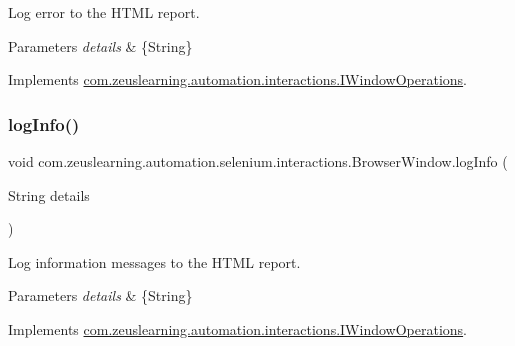 Log error to the H\+T\+ML report.


\begin{DoxyParams}{Parameters}
{\em details} & \{String\} \\
\hline
\end{DoxyParams}


Implements \hyperlink{interfacecom_1_1zeuslearning_1_1automation_1_1interactions_1_1IWindowOperations_ac2c4ec2b0ed8f6d50d24786e859f9315}{com.\+zeuslearning.\+automation.\+interactions.\+I\+Window\+Operations}.

\hypertarget{classcom_1_1zeuslearning_1_1automation_1_1selenium_1_1interactions_1_1BrowserWindow_a39c9a28e17c925a56f2948dee5b9d00e}{}\label{classcom_1_1zeuslearning_1_1automation_1_1selenium_1_1interactions_1_1BrowserWindow_a39c9a28e17c925a56f2948dee5b9d00e} 
\subsubsection{\texorpdfstring{log\+Info()}{logInfo()}}
{\footnotesize\ttfamily void com.\+zeuslearning.\+automation.\+selenium.\+interactions.\+Browser\+Window.\+log\+Info (\begin{DoxyParamCaption}\item[{String}]{details }\end{DoxyParamCaption})\hspace{0.3cm}{\ttfamily [inline]}}

Log information messages to the H\+T\+ML report.


\begin{DoxyParams}{Parameters}
{\em details} & \{String\} \\
\hline
\end{DoxyParams}


Implements \hyperlink{interfacecom_1_1zeuslearning_1_1automation_1_1interactions_1_1IWindowOperations_ab8dcfa34ce29883587eed3fcc9ca83fd}{com.\+zeuslearning.\+automation.\+interactions.\+I\+Window\+Operations}.

\hypertarget{classcom_1_1zeuslearning_1_1automation_1_1selenium_1_1interactions_1_1BrowserWindow_ac1a4682b2ae296ccc8ce7c10bf0f48d0}{}\label{classcom_1_1zeuslearning_1_1automation_1_1selenium_1_1interactions_1_1BrowserWindow_ac1a4682b2ae296ccc8ce7c10bf0f48d0} 
